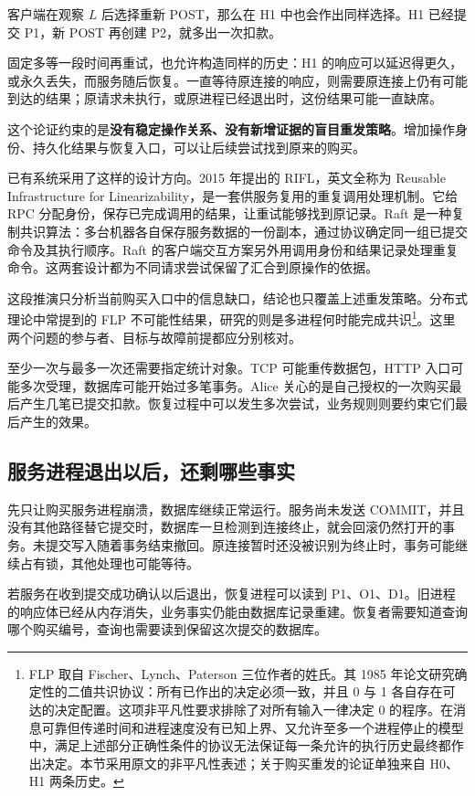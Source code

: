 客户端在观察 $L$ 后选择重新 POST，那么在 H1 中也会作出同样选择。H1 已经提交 P1，新 POST 再创建 P2，就多出一次扣款。

固定多等一段时间再重试，也允许构造同样的历史：H1 的响应可以延迟得更久，或永久丢失，而服务随后恢复。一直等待原连接的响应，则需要原连接上仍有可能到达的结果；原请求未执行，或原进程已经退出时，这份结果可能一直缺席。

这个论证约束的是\textbf{没有稳定操作关系、没有新增证据的盲目重发策略}。增加操作身份、持久化结果与恢复入口，可以让后续尝试找到原来的购买。

已有系统采用了这样的设计方向。2015 年提出的 RIFL，英文全称为 Reusable Infrastructure for Linearizability，是一套供服务复用的重复调用处理机制。它给 RPC 分配身份，保存已完成调用的结果，让重试能够找到原记录。Raft 是一种复制共识算法：多台机器各自保存服务数据的一份副本，通过协议确定同一组已提交命令及其执行顺序。Raft 的客户端交互方案另外用调用身份和结果记录处理重复命令\cite{rifl,raft}。这两套设计都为不同请求尝试保留了汇合到原操作的依据。

这段推演只分析当前购买入口中的信息缺口，结论也只覆盖上述重发策略。分布式理论中常提到的 FLP 不可能性结果，研究的则是多进程何时能完成共识\footnote{FLP 取自 Fischer、Lynch、Paterson 三位作者的姓氏。其 1985 年论文研究确定性的二值共识协议：所有已作出的决定必须一致，并且 0 与 1 各自存在可达的决定配置。这项非平凡性要求排除了对所有输入一律决定 0 的程序。在消息可靠但传递时间和进程速度没有已知上界、又允许至多一个进程停止的模型中，满足上述部分正确性条件的协议无法保证每一条允许的执行历史最终都作出决定\cite{flp}。本节采用原文的非平凡性表述；关于购买重发的论证单独来自 H0、H1 两条历史。}。这里两个问题的参与者、目标与故障前提都应分别核对。

至少一次与最多一次还需要指定统计对象。TCP 可能重传数据包，HTTP 入口可能多次受理，数据库可能开始过多笔事务。Alice 关心的是自己授权的一次购买最后产生几笔已提交扣款。恢复过程中可以发生多次尝试，业务规则则要约束它们最后产生的效果。

\subsection*{服务进程退出以后，还剩哪些事实}

先只让购买服务进程崩溃，数据库继续正常运行。服务尚未发送 COMMIT，并且没有其他路径替它提交时，数据库一旦检测到连接终止，就会回滚仍然打开的事务。未提交写入随着事务结束撤回。原连接暂时还没被识别为终止时，事务可能继续占有锁，其他处理也可能等待。

若服务在收到提交成功确认以后退出，恢复进程可以读到 P1、O1、D1。旧进程的响应体已经从内存消失，业务事实仍能由数据库记录重建。恢复者需要知道查询哪个购买编号，查询也需要读到保留这次提交的数据库。

